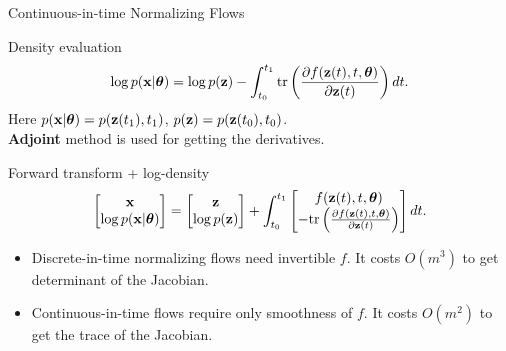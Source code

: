 \begin{frame}{Continuous-in-time Normalizing Flows}
	\begin{block}{Density evaluation}
		\vspace{-0.4cm}
		\[
		\log p(\mathbf{x} | \boldsymbol{\theta}) = \log p(\mathbf{z}) - \int_{t_0}^{t_1} \text{tr}  \left( \frac{\partial f (\mathbf{z}(t), t, \boldsymbol{\theta})}{\partial \mathbf{z}(t)} \right) dt.
		\]
		Here $p(\mathbf{x} | \boldsymbol{\theta}) = p(\mathbf{z}(t_1), t_1)$, $p(\mathbf{z}) = p(\mathbf{z}(t_0), t_0)$. \\
		\textbf{Adjoint} method is used for getting the derivatives.
	\end{block}
	\begin{block}{Forward transform + log-density}
		\vspace{-0.3cm}
		\[
			\begin{bmatrix}
				\mathbf{x} \\
				\log p(\mathbf{x} | \boldsymbol{\theta})
			\end{bmatrix}
			= 
			\begin{bmatrix}
				\mathbf{z} \\
				\log p(\mathbf{z})
			\end{bmatrix} + 
			\int_{t_0}^{t_1} 
			\begin{bmatrix}
				f(\mathbf{z}(t), t, \boldsymbol{\theta}) \\
				- \text{tr} \left( \frac{\partial f(\mathbf{z}(t), t, \boldsymbol{\theta})}{\partial \mathbf{z}(t)} \right) 
			\end{bmatrix} dt.
		\]
		\vspace{-0.4cm}
	\end{block}
	\begin{itemize}
		\item Discrete-in-time normalizing flows need invertible $f$. It costs $O(m^3)$ to get determinant of the Jacobian.
		\item Continuous-in-time flows require only smoothness of $f$. It costs $O(m^2)$ to get the trace of the Jacobian.
	\end{itemize}
\end{frame}
